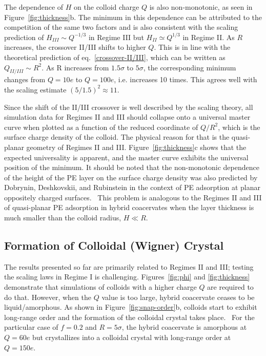 \documentclass[journal=mamobx, manuscript=article]{achemso}
\begin{document}
The dependence of $H$ on the colloid charge $Q$ is also non-monotonic, as seen in Figure~\ref{fig:thickness}b. The minimum in this dependence can be attributed to the competition of the same two factors and is also consistent with the scaling prediction of $H_{III} \sim Q^{-1/3}$ in Regime III but $H_{II} \simeq Q^{1/3}$ in Regime II. As $R$ increases, the crossover II/III shifts to higher $Q$. This is in line with the theoretical prediction of eq.~\ref{crossover-II/III}, which can be written as $Q_{II/III} \sim R^2$. As R increases from $1.5\sigma$ to $5\sigma$, the corresponding minimum changes from $Q = 10e$ to $Q = 100e$, i.e. increases 10 times. This agrees well with the scaling estimate $(5/1.5)^{2} \approx 11$.   


Since the shift of the II/III crossover is well described by the scaling theory, all simulation data for Regimes II and III should collapse onto a universal master curve when plotted as a function of the reduced coordinate of $Q/R^2$, which is the surface charge density of the colloid. The physical reason for that is the quasi-planar geometry of Regimes II and III. Figure~\ref{fig:thickness}c shows that the expected universality is apparent, and the master curve exhibits the universal position of the minimum. It should be noted that the non-monotonic dependence of the height of the PE layer on the surface charge density was also predicted by Dobrynin, Deshkovskii, and Rubinstein in the context of PE adsorption at planar oppositely charged surfaces.~\cite{dobrynin2000,dobrynin2001} This problem is analogous to the Regimes II and III of quasi-planar PE adsorption in hybrid coacervates when the layer thickness is much smaller than the colloid radius, $H \ll R$.~\cite{artem2022hybrid}




\subsection{Formation of Colloidal (Wigner) Crystal}
\label{crystal}

The results presented so far are primarily related to Regimes II and III; testing the scaling laws in Regime I is challenging. Figures~\ref{fig:phi} and \ref{fig:thickness} demonstrate that simulations of colloids with a higher charge $Q$ are required to do that. However, when the $Q$ value is too large, hybrid coacervate ceases to be liquid/amorphous. As shown in Figure~\ref{fig:snap-order}b, colloids start to exhibit long-range order and the formation of the colloidal crystal takes place.~\cite{chaikin1982} For the particular case of $f = 0.2$ and $R = 5 \sigma$, the hybrid coacervate is amorphous at $Q=60e$ but crystallizes into a colloidal crystal with long-range order at $Q = 150e$.
\end{document}
